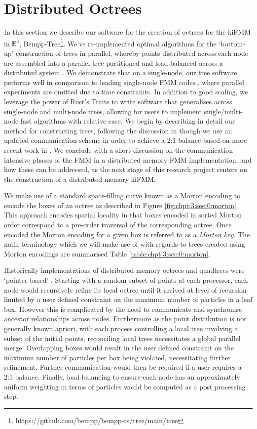 \section{Distributed Octrees}

In this section we describe our software for the creation of octrees for the kiFMM in $\mathbb{R}^3$, Bempp-Tree\footnote{https://github.com/bempp/bempp-rs/tree/main/tree}. We've re-implemented optimal algorithms for the `bottom-up' construction of trees in parallel, whereby points distributed across each node are assembled into a parallel tree partitioned and load-balanced across a distributed system \cite{sundar2008bottom}. We demonstrate that on a single-node, our tree software performs well in comparison to leading single-node FMM codes \cite{wang2021exafmm}, where parallel experiments are omitted due to time constraints. In addition to good scaling, we leverage the power of Rust's Traits to write software that generalises across single-node and multi-node trees, allowing for users to implement single/multi-node fast algorithms with relative ease. We begin by describing in detail our method for constructing trees, following the discussion in \cite{sundar2008bottom} though we use an updated communication scheme in order to achieve a 2:1 balance based on more recent work in \cite{sundar2013hyksort}. We conclude with a short discussion on the communication intensive phases of the FMM in a distributed-memory FMM implementation, and how these can be addressed, as the next stage of this research project centers on the construction of a distributed memory kiFMM.

We make use of a standard space-filling curve known as a Morton encoding \cite{sundar2008bottom} to encode the boxes of an octree as described in Figure \ref{fig:chpt:3:sec:0:morton}. This approach encodes spatial locality in that boxes encoded in sorted Morton order correspond to a pre-order traversal of the corresponding octree. Once encoded the Morton encoding for a given box is referred to as a \textit{Morton key}. The main terminology which we will make use of with regards to trees created using Morton encodings are summarised Table \ref{table:chpt:3:sec:0:morton}.

Historically implementations of distributed memory octrees and quadtrees were `pointer based' \cite{tu2005scalable}. Starting with a random subset of points at each processor, each node would recursively refine its local octree until it arrived at level of recursion limited by a user defined constraint on the maximum number of particles in a leaf box. However this is complicated by the need to communicate and synchronise ancestor relationships across nodes. Furthermore as the point distribution is not generally known apriori, with each process controlling a local tree involving a subset of the initial points, reconciling local trees necessitates a global parallel merge. Overlapping boxes would result in the user defined constraint on the maximum number of particles per box being violated, necessitating further refinement. Further communication would then be required if a user requires a 2:1 balance. Finally, load-balancing to ensure each node has an approximately uniform weighting in terms of particles would be computed as a post processing step.

